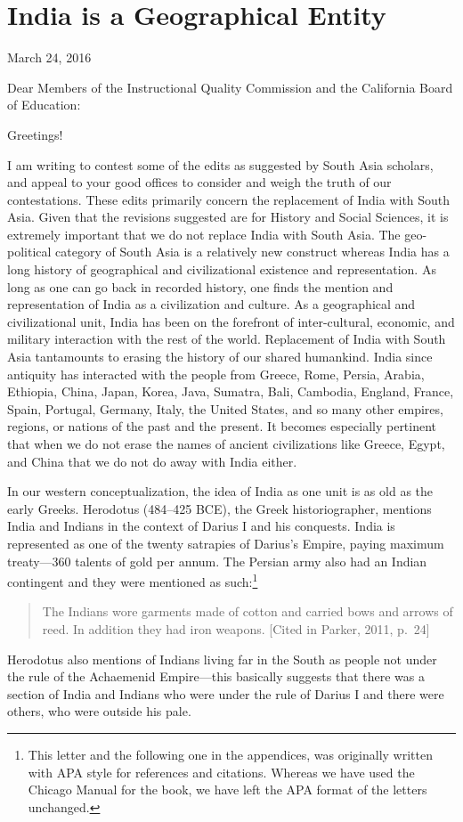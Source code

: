 \chapter{India is a Geographical Entity}

March 24, 2016
\vskip 2pt

Dear Members of the Instructional Quality Commission and the California Board of Education:
\vskip 2pt

Greetings!
\vskip 2pt

I am writing to contest some of the edits as suggested by South Asia scholars, and appeal to your good offices to consider and weigh the truth of our contestations. These edits primarily concern the replacement of India with South Asia. Given that the revisions suggested are for History and Social Sciences, it is extremely important that we do not replace India with South Asia. The geo-political category of South Asia is a relatively new construct whereas India has a long history of geographical and civilizational existence and representation. As long as one can go back in recorded history, one finds the mention and representation of India as a civilization and culture. As a geographical and civilizational unit, India has been on the forefront of inter-cultural, economic, and military interaction with the rest of the world. Replacement of India with South Asia tantamounts to erasing the history of our shared humankind. India since antiquity has interacted with the people from Greece, Rome, Persia, Arabia, Ethiopia, China, Japan, Korea, Java, Sumatra, Bali, Cambodia, England, France, Spain, Portugal, Germany, Italy, the United States, and so many other empires, regions, or nations of the past and the present. It becomes especially pertinent that when we do not erase the names of ancient civilizations like Greece, Egypt, and China that we do not do away with India either.

In our western conceptualization, the idea of India as one unit is as old as the early Greeks. Herodotus (484--425 BCE), the Greek historiographer, mentions India and Indians in the context of Darius I and his conquests. India is represented as one of the twenty satrapies of Darius’s Empire, paying maximum treaty—360 talents of gold per annum. The Persian army also had an Indian contingent and they were mentioned as such:\footnote{This letter and the following one in the appendices, was originally written with APA style for references and citations. Whereas we have used the Chicago Manual for the book, we have left the APA format of the letters unchanged.}
\begin{quote}
The Indians wore garments made of cotton and carried bows and arrows of reed. In addition they had iron weapons. [Cited in Parker, 2011, p.\ 24]
\end{quote}
Herodotus also mentions of Indians living far in the South as people not under the rule of the Achaemenid Empire—this basically suggests that there was a section of India and Indians who were under the rule of Darius I and there were others, who were outside his pale.

